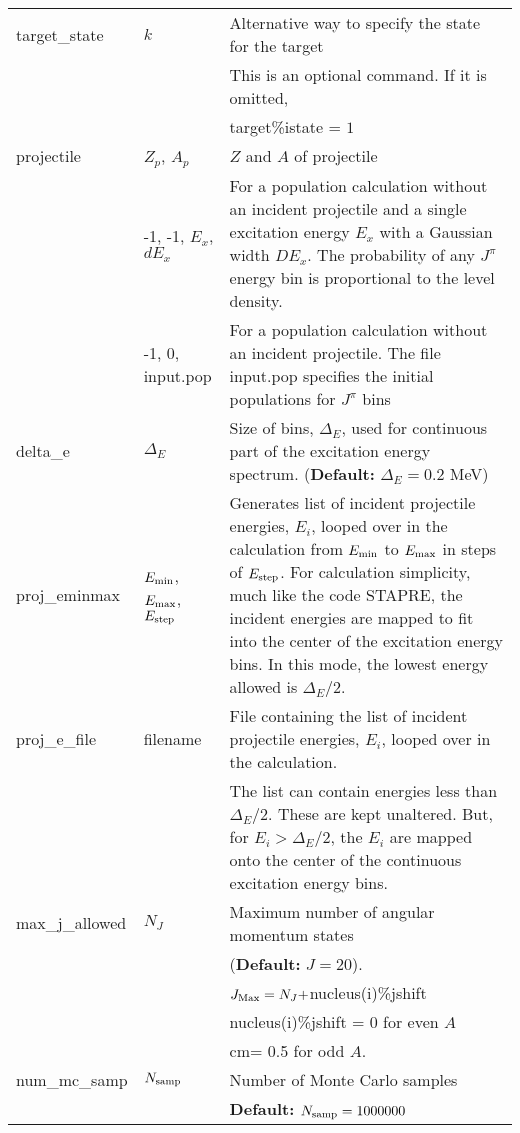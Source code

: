 \documentclass[
10pt,
showpacs,preprintnumbers,nofootinbib,
amsmath,amssymb,
aps,prc,groupedaddress,superscriptaddress,
notitlepage,showkeys
]{revtex4-1}
\begin{document}
\begin{center}
\begin{tabular}{| p{4cm} | p{4 cm} | p{9 cm} |}
target\_state & $k$ &          Alternative way to specify the state for the target \\
 & & This is an optional command. If it is omitted, \\
 & & target\%istate = $1$\\
\hline
projectile & $Z_p$,  $A_p$  &         $Z$ and $A$ of projectile \\
  & -1, -1,  $E_x$, $dE_x$   &  For a population calculation without an incident projectile and a single excitation energy $E_x$ with a Gaussian width $DE_x$. The probability of any $J^\pi$ energy bin is proportional to the level density.\\
  & -1, 0,   input.pop   &  For a population calculation without an incident projectile. The file input.pop specifies the initial populations for $J^\pi$ bins \\
\hline
delta\_e &  $\Delta_E$ &    Size of bins, $\Delta_E$, used for continuous part of the excitation energy spectrum. ({\bf Default:} $\Delta_E = 0.2$  MeV) \\
\hline
proj\_eminmax  & $E_{\rm min}$, $E_{\rm max}$, $E_{\rm step}$ &
    Generates list of incident projectile energies, $E_i$, looped over in the 
    calculation from $E_{\rm min}$ to $E_{\rm max}$ in steps of $E_{\rm step}$. For calculation 
    simplicity, much like the code STAPRE, the incident energies are mapped 
    to fit into the center of the excitation energy bins. In this mode, the 
    lowest energy allowed is $\Delta_E/2$. \\
 \hline
proj\_e\_file  & filename &
       File containing the list of incident projectile energies, $E_i$, looped over
       in the calculation. \\
& & The list can contain energies less than $\Delta_E/2$.
      These are kept unaltered. But, for $E_i > \Delta_E/2$, the $E_i$ are 
      mapped onto the center of the continuous excitation energy bins.\\
\hline
max\_j\_allowed & $N_J$ &  Maximum number of angular momentum states \\
 & & ({\bf Default:} $J=20$).\\
  &  &   $J_{\rm Max} = N_J + $nucleus(i)\%jshift  \\
  &  &  nucleus(i)\%jshift = 0 for even $A$ \\
  &  &  \hskip 2.7 cm= 0.5 for odd $A$. \\
\hline
num\_mc\_samp  & $N_{\rm samp}$ &    Number of Monte Carlo samples \\
 &  &  {\bf Default:} $N_{\rm samp} = 1000000$\\

\end{tabular}
\end{center}
\end{document}

